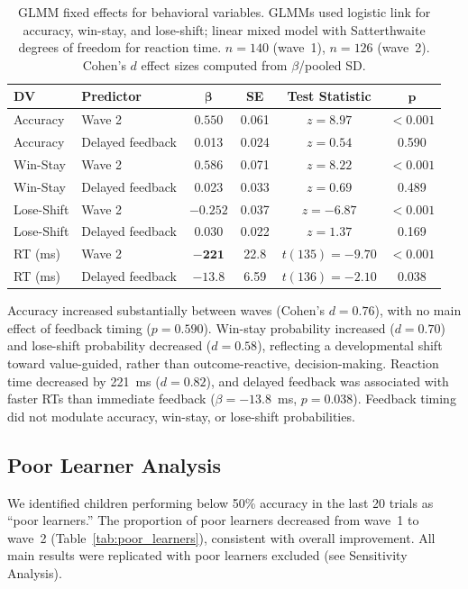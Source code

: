 \documentclass[11pt]{article}
\begin{document}
\begin{table}[H]
\centering
\caption{GLMM fixed effects for behavioral variables. GLMMs used logistic link for accuracy, win-stay, and lose-shift; linear mixed model with Satterthwaite degrees of freedom for reaction time. $n = 140$ (wave~1), $n = 126$ (wave~2). Cohen's $d$ effect sizes computed from $\beta$/pooled SD.}
\label{tab:glmm}
\begin{tabular}{llcccc}
\toprule
\textbf{DV} & \textbf{Predictor} & $\boldsymbol{\beta}$ & \textbf{SE} & \textbf{Test Statistic} & $\boldsymbol{p}$ \\
\midrule
Accuracy & Wave 2 & $\mathbf{0.550}$ & 0.061 & $z = 8.97$ & $< 0.001$ \\
Accuracy & Delayed feedback & 0.013 & 0.024 & $z = 0.54$ & 0.590 \\
Win-Stay & Wave 2 & $\mathbf{0.586}$ & 0.071 & $z = 8.22$ & $< 0.001$ \\
Win-Stay & Delayed feedback & 0.023 & 0.033 & $z = 0.69$ & 0.489 \\
Lose-Shift & Wave 2 & $\mathbf{-0.252}$ & 0.037 & $z = -6.87$ & $< 0.001$ \\
Lose-Shift & Delayed feedback & 0.030 & 0.022 & $z = 1.37$ & 0.169 \\
RT (ms) & Wave 2 & $\mathbf{-221}$ & 22.8 & $t(135) = -9.70$ & $< 0.001$ \\
RT (ms) & Delayed feedback & $-13.8$ & 6.59 & $t(136) = -2.10$ & 0.038 \\
\bottomrule
\end{tabular}
\end{table}

Accuracy increased substantially between waves (Cohen's $d = 0.76$), with no main effect of feedback timing ($p = 0.590$). Win-stay probability increased ($d = 0.70$) and lose-shift probability decreased ($d = 0.58$), reflecting a developmental shift toward value-guided, rather than outcome-reactive, decision-making. Reaction time decreased by 221~ms ($d = 0.82$), and delayed feedback was associated with faster RTs than immediate feedback ($\beta = -13.8$~ms, $p = 0.038$). Feedback timing did not modulate accuracy, win-stay, or lose-shift probabilities.

\subsection{Poor Learner Analysis}

We identified children performing below 50\% accuracy in the last 20 trials as ``poor learners.'' The proportion of poor learners decreased from wave~1 to wave~2 (Table~\ref{tab:poor_learners}), consistent with overall improvement. All main results were replicated with poor learners excluded (see Sensitivity Analysis).
\end{document}
